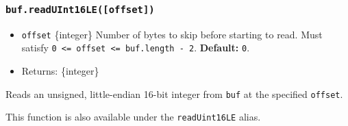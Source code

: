 \begin{Shaded}
\begin{Highlighting}[]
\NormalTok{ \{ }\NormalTok{ \} }\OperatorTok{=} \NormalTok{(}\NormalTok{)}\OperatorTok{;}

\OperatorTok{=} \NormalTok{([}\OperatorTok{,} \OperatorTok{,} \NormalTok{])}\OperatorTok{;}

\NormalTok{(}\NormalTok{)}\NormalTok{(}\NormalTok{))}\OperatorTok{;}
\NormalTok{(}\NormalTok{)}\NormalTok{(}\NormalTok{))}\OperatorTok{;}
\end{Highlighting}
\end{Shaded}

\subsubsection{\texorpdfstring{\texttt{buf.readUInt16LE({[}offset{]})}}{buf.readUInt16LE({[}offset{]})}}\label{buf.readuint16leoffset}

\begin{itemize}
\tightlist
\item
  \texttt{offset} \{integer\} Number of bytes to skip before starting to
  read. Must satisfy
  \texttt{0\ \textless{}=\ offset\ \textless{}=\ buf.length\ -\ 2}.
  \textbf{Default:} \texttt{0}.
\item
  Returns: \{integer\}
\end{itemize}

Reads an unsigned, little-endian 16-bit integer from \texttt{buf} at the
specified \texttt{offset}.

This function is also available under the \texttt{readUint16LE} alias.

